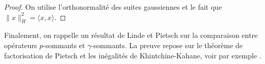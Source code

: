 \documentclass{smfart}
\theoremstyle{plain}
\theoremstyle{definition}
\newcommand {\norm}[1] {\| #1 \|}               %
\begin{document}
\begin{proof} On utilise l'orthonormalité des suites gaussiennes et le fait que $\norm{x}^2_H = \langle x, x \rangle$.
\end{proof}

\noindent Finalement, on rappelle un résultat de Linde et Pietsch
\cite{lp,Pietsch} sur la comparaison entre opérateurs $p$-sommants et
$\gamma$-sommants. La preuve repose sur le théorème de factorisation
de Pietsch et les inégalités de Khintchine-Kahane, voir par exemple
\cite[Proposition 12.1]{jvn}.
\end{document}
